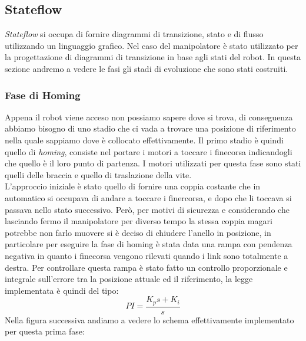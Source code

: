 \subsection{Stateflow}
\textit{Stateflow} si occupa di fornire diagrammi di transizione, stato e di flusso utilizzando un linguaggio grafico. Nel caso del manipolatore è stato utilizzato per la progettazione di diagrammi di transizione in base agli stati del robot. In questa sezione andremo a vedere le fasi gli stadi di evoluzione che sono stati costruiti.
\subsubsection{Fase di Homing}
Appena il robot viene acceso non possiamo sapere dove si trova, di conseguenza abbiamo bisogno di uno stadio che ci vada a trovare una posizione di riferimento nella quale sappiamo dove è collocato effettivamente. Il primo stadio è quindi quello di \textit{homing}, consiste nel portare i motori a toccare i finecorsa indicandogli che quello è il loro punto di partenza. I motori utilizzati per questa fase sono stati quelli delle braccia e quello di traslazione della vite.
\\L'approccio iniziale è stato quello di fornire una coppia costante che in automatico si occupava di andare a toccare i finercorsa, e dopo che li toccava si passava nello stato successivo. Però, per motivi di sicurezza e considerando che lasciando fermo il manipolatore per diverso tempo la stessa coppia magari potrebbe non farlo muovere si è deciso di chiudere l'anello in posizione, in particolare per eseguire la fase di homing è stata data una rampa con pendenza negativa in quanto i finecorsa vengono rilevati quando i link sono totalmente a destra.
Per controllare questa rampa è stato fatto un controllo proporzionale e integrale sull'errore tra la posizione attuale ed il riferimento, la legge implementata è quindi del tipo:
\begin{equation*}
	PI = \frac{K_p s + K_i}{s}
\end{equation*}
Nella figura successiva andiamo a vedere lo schema effettivamente implementato per questa prima fase:

